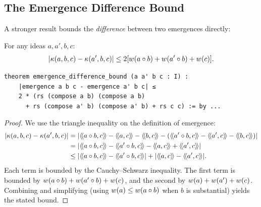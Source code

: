 \subsection{The Emergence Difference Bound}

A stronger result bounds the \emph{difference} between two emergences directly:

\begin{theorem}
\label{thm:emergence-difference-bound}
For any ideas $a, a', b, c$:
\[
  |\kappa(a, b, c) - \kappa(a', b, c)| \leq 2[w(a \circ b) + w(a' \circ b) + w(c)].
\]
\end{theorem}

\begin{lstlisting}[caption={Difference bound (IDT\_v3\_Emergence.lean)}]
theorem emergence_difference_bound (a a' b c : I) :
    |emergence a b c - emergence a' b c| ≤
    2 * (rs (compose a b) (compose a b)
      + rs (compose a' b) (compose a' b) + rs c c) := by ...
\end{lstlisting}

\begin{proof}
We use the triangle inequality on the definition of emergence:
\begin{align*}
|\emerge(a,b,c) - \emerge(a',b,c)|
&= |\rs{a \compose b}{c} - \rs{a}{c} - \rs{b}{c} - (\rs{a' \compose b}{c} - \rs{a'}{c} - \rs{b}{c})| \\
&= |\rs{a \compose b}{c} - \rs{a' \compose b}{c} - \rs{a}{c} + \rs{a'}{c}| \\
&\leq |\rs{a \compose b}{c} - \rs{a' \compose b}{c}| + |\rs{a}{c} - \rs{a'}{c}|.
\end{align*}
Each term is bounded by the Cauchy--Schwarz inequality. The first term is
bounded by $w(a \circ b) + w(a' \circ b) + w(c)$, and
the second by $w(a) + w(a') + w(c)$. Combining and
simplifying (using $w(a) \leq w(a \circ b)$ when $b$ is
substantial) yields the stated bound.
\end{proof}

